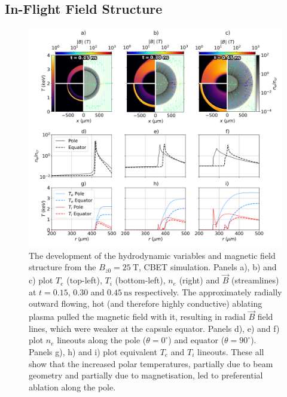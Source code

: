 \subsection{In-Flight Field Structure}%
\label{sec:Res2_field_structure}

\begin{figure}[t!]
    \includegraphics[width=\linewidth]{Results2/Images/mag_early_B_develop.png}
    \centering
    \caption{The development of the hydrodynamic variables and magnetic field structure from the $B_{z0}=25\ \text{T}$, \ac{CBET} simulation.
    Panels a), b) and c) plot $T_e$ (top-left), $T_i$ (bottom-left), $n_e$ (right) and $\vec{B}$ (streamlines) at $t=0.15$, $0.30$ and $0.45\ \text{ns}$ respectively.
    The approximately radially outward flowing, hot (and therefore highly conductive) ablating plasma pulled the magnetic field with it, resulting in radial $\vec{B}$ field lines, which were weaker at the capsule equator.
    Panels d), e) and f) plot $n_e$ lineouts along the pole ($\theta=0^{\circ}$) and equator ($\theta=90^{\circ}$).
    Panels g), h) and i) plot equivalent $T_e$ and $T_i$ lineouts.
    These all show that the increased polar temperatures, partially due to beam geometry and partially due to magnetisation, led to preferential ablation along the pole.}%
    \label{fig:Res2_mag_early_B_develop}
\end{figure}


